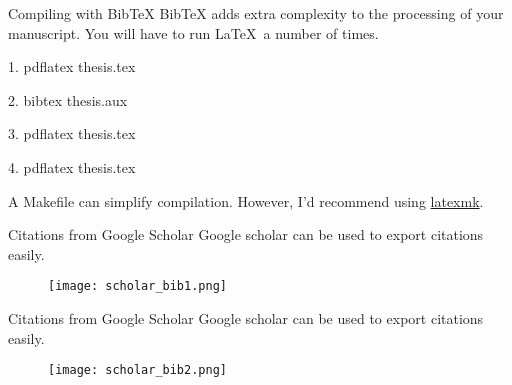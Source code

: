 \begin{frame}{Compiling with BibTeX}
  BibTeX adds extra complexity to the processing of your manuscript. You will
  have to run \LaTeX\ a number of times.

  \alert{1.} pdflatex thesis.tex

  \alert{2.} bibtex thesis.\alert{aux}

  \alert{3.} pdflatex thesis.tex

  \alert{4.} pdflatex thesis.tex

  A Makefile can simplify compilation. However, I'd recommend using
  \href{https://ctan.org/pkg/latexmk?lang=en}{latexmk}.
\end{frame}

\begin{frame}{Citations from Google Scholar}
  Google scholar can be used to export citations easily.
  \begin{figure}
    \centering
    \texttt{[image: scholar\_bib1.png]}
  \end{figure}
\end{frame}

\begin{frame}{Citations from Google Scholar}
Google scholar can be used to export citations easily.
  \begin{figure}
    \centering
    \texttt{[image: scholar\_bib2.png]}
  \end{figure}
\end{frame}

